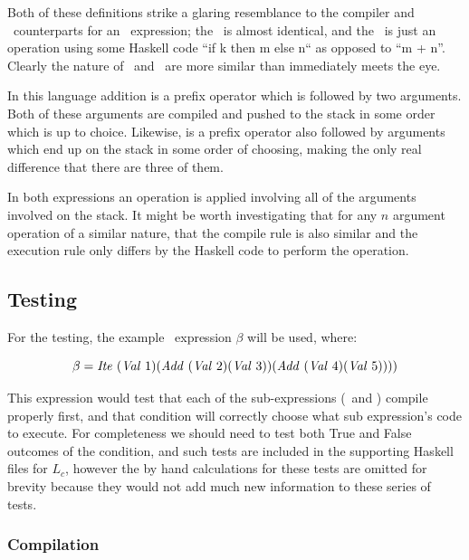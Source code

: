\documentclass {article}
\begin{document}
Both of these definitions strike a glaring resemblance to
the compiler and \vm\ counterparts for an \add\ expression;
the \compp\ is almost identical, and the \exec\ is just an
operation using some Haskell code ``if k then m else n`` as 
opposed to ``m + n''.
Clearly the nature of \add\ and \ite\
are more similar than immediately meets the eye.

In this language
addition is a prefix operator which is followed by two arguments.
Both of these arguments are compiled and pushed to the stack
in some order which is up to choice. Likewise, \ite is a prefix operator also followed by arguments 
which end up on the stack in some order of choosing, 
making the only real difference that there are three of them.

In both expressions an operation is applied involving all 
of the arguments involved on the stack. It might be worth
investigating that for any $n$ argument operation of a similar
nature, that the compile rule is also similar and the 
execution rule only differs by the Haskell 
code to perform the operation.


\subsection{Testing}\label{itetests}

For the testing, the example \ite\ expression $\beta$ will be used, where:

\[\beta = \mathit{Ite\ } (\mathit{Val\ } 1) 
	(\mathit{Add\ } (\mathit{Val\ } 2) (\mathit{Val\ } 3)) (\mathit{Add\ } (\mathit{Val\ } 4) (\mathit{Val\ } 5)))) \]

This expression would test that
each of the sub-expressions 
(\add\ and \val) compile properly first, 
and that condition will correctly  choose what
 sub expression's code to execute.
For completeness we should need to 
test both True and False outcomes of the condition, and
such tests are included in the supporting Haskell files for $L_c$, 
however the by hand calculations for these tests are omitted
for brevity because they would not add much new
information to these series of tests.

\subsubsection{Compilation}
\end{document}
